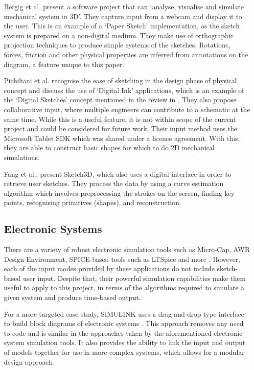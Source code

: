 \documentclass[11pt]{article}
\begin{document}
Bergig et al. \cite{5336490} present a software project that can `analyse, visualise and simulate mechanical system in 3D'.
They capture input from a webcam and display it to the user. This is an example of a `Paper Sketch' implementation, as the
sketch system is prepared on a non-digital medium. They make use of orthographic projection techniques to produce simple systems
of the sketches. Rotations, forces, friction and other physical properties are inferred from annotations on the diagram, a feature
unique to this paper.

Pichiliani et al. \cite{5460522} recognise the ease of sketching in the design phase of physical concept and discuss
the use of `Digital Ink' applications, which is an example of the `Digital Sketches' concept mentioned in the review in
\cite{101017S}. They also propose collaborative input, where multiple engineers can contribute to a schematic at the same
time. While this is a useful feature, it is not within scope of the current project and could be considered for future
work. Their input method uses the Microsoft Tablet \gls{SDK} which was shared under a licence agreement. With this, they
are able to construct basic shapes for which to do 2D mechanical simulations.

Fang et al., \cite{4722231} present Sketch3D, which also uses a digital interface in order to retrieve user sketches.
They process the data by using a curve estimation algorithm which involves preprocessing the strokes on the screen, finding
key points, recognising primitives (shapes), and reconstruction.

\subsection{Electronic Systems}
\label{subsec:Electronic Systems}

There are a variety of robust electronic simulation tools such as Micro-Cap, AWR Design Environment, \gls{SPICE}-based
tools such as LTSpice and more \cite{web:micro-cap,web:awrde,web:ltspice}. However, each of the input modes provided by
these applications do not include sketch-based user input. Despite that, their powerful simulation capabilities make them
useful to apply to this project, in terms of the algorithms required to simulate a given system and produce time-based output.

For a more targeted case study, SIMULINK uses a drag-and-drop type interface to build block diagrams of electronic systems
\cite{web:simulink}. This approach removes any need to code and is similar in the approaches
taken by the aforementioned electronic system simulation tools. It also provides the ability to link the input and output of
models together for use in more complex systems, which allows for a modular design approach.
\end{document}
